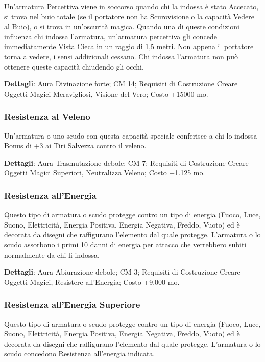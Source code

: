 \begin{multicols}{2}
Un'armatura Percettiva viene in soccorso quando chi la indossa è stato Accecato, si trova nel buio totale (se il portatore non ha Scurovisione o la capacità Vedere al Buio), o si trova in un'oscurità magica. Quando una di queste condizioni influenza chi indossa l'armatura, un'armatura percettiva gli concede immediatamente Vista Cieca in un raggio di 1,5 metri. Non appena il portatore torna a vedere, i sensi addizionali cessano. Chi indossa l'armatura non può ottenere queste capacità chiudendo gli occhi.

\textbf{Dettagli}: Aura Divinazione forte; CM 14; Requisiti di Costruzione Creare Oggetti Magici Meravigliosi, Visione del Vero; Costo +15000 mo.

\subsubsection{Resistenza al Veleno}

Un'armatura o uno scudo con questa capacità speciale conferisce a chi lo indossa Bonus di +3 ai Tiri Salvezza contro il veleno.

\textbf{Dettagli}: Aura Trasmutazione debole; CM 7; Requisiti di Costruzione Creare Oggetti Magici Superiori, Neutralizza Veleno; Costo +1.125 mo.

\subsubsection{Resistenza all'Energia}

Questo tipo di armatura o scudo protegge contro un tipo di energia (Fuoco, Luce, Suono, Elettricità, Energia Positiva, Energia Negativa, Freddo, Vuoto) ed è decorata da disegni che raffigurano l'elemento dal quale protegge. L'armatura o lo scudo assorbono i primi 10 danni di energia per attacco che verrebbero subiti normalmente da chi li indossa.

\textbf{Dettagli}: Aura Abiurazione debole; CM 3; Requisiti di Costruzione Creare Oggetti Magici, Resistere all'Energia; Costo +9.000 mo.

\subsubsection{Resistenza all'Energia Superiore}

Questo tipo di armatura o scudo protegge contro un tipo di energia (Fuoco, Luce, Suono, Elettricità, Energia Positiva, Energia Negativa, Freddo, Vuoto) ed è decorata da disegni che raffigurano l'elemento dal quale protegge. L'armatura o lo scudo concedono Resistenza all'energia indicata.


\end{multicols}
